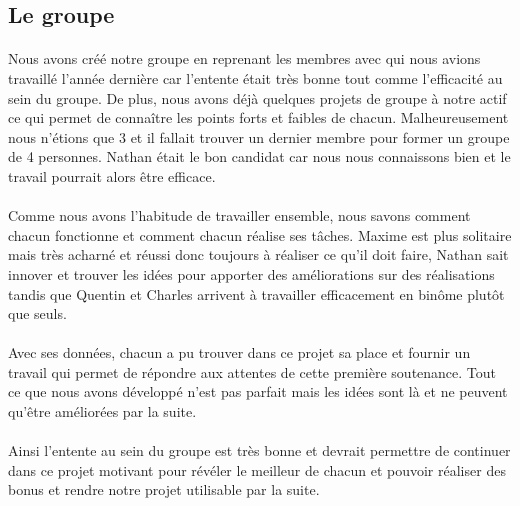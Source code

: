 \documentclass{article}
\begin{document}
\newpage


\subsection{Le groupe}

\paragraph{}Nous avons créé notre groupe en reprenant les membres avec qui nous avions travaillé l'année dernière car l'entente était très bonne tout comme l'efficacité au sein du groupe. De plus, nous avons déjà quelques projets de groupe à notre actif ce qui permet de connaître les points forts et faibles de chacun. Malheureusement nous n'étions que 3 et il fallait trouver un dernier membre pour former un groupe de 4 personnes. Nathan était le bon candidat car nous nous connaissons bien et le travail pourrait alors être efficace.

\paragraph{}Comme nous avons l'habitude de travailler ensemble, nous savons comment chacun fonctionne et comment chacun réalise ses tâches. Maxime est plus solitaire mais très acharné et réussi donc toujours à réaliser ce qu'il doit faire, Nathan sait innover et trouver les idées pour apporter des améliorations sur des réalisations tandis que Quentin et Charles arrivent à travailler efficacement en binôme plutôt que seuls.

\paragraph{}Avec ses données, chacun a pu trouver dans ce projet sa place et fournir un travail qui permet de répondre aux attentes de cette première soutenance. Tout ce que nous avons développé n'est pas parfait mais les idées sont là et ne peuvent qu'être améliorées par la suite.

\paragraph{}Ainsi l'entente au sein du groupe est très bonne et devrait permettre de continuer dans ce projet motivant pour révéler le meilleur de chacun et pouvoir réaliser des bonus et rendre notre projet utilisable par la suite.
\end{document}
